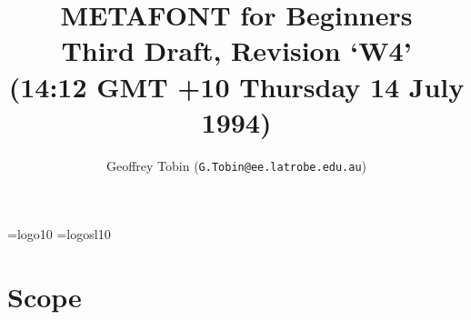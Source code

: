 

\oddsidemargin=0in
\evensidemargin=0in
\marginparwidth=0in
\marginparsep=0in


\textwidth=6.25in


\addtolength{\textheight}{\topmargin}
\topmargin=0in
\addtolength{\textheight}{0.4in}

\font\mf=logo10
\font\mfsl=logosl10
\hyphenchar{}
\hyphenchar{}
\newcommand{\MF}{{\mf META}\-{\mf FONT\/}}
\newcommand{\MFSL}{{\mfsl META}\-{\mfsl FONT\/}}
\newcommand{\MFbook}{{\sl The \MFSL{}book\/}}
\newcommand{\TeXbook}{{\sl The \TeX{}book\/}}
\newcommand{\BibTeX}{{\rm B\kern-.05em{\sc i\kern-.025em b}\kern-.08em
                      T\kern-.1667em\lower.7ex\hbox{E}\kern-.125emX}}
\newcommand{\ttbsl}{{\tt \char`\\\/}}  %

\title{%
  \vspace*{-1in}%
  METAFONT for Beginners\\%
  {\normalsize Third Draft, Revision `W4'}\\%
  {\normalsize (14:12 GMT +10  Thursday 14 July 1994)}%
}

\date{}

\author{Geoffrey {\sc Tobin} ({\tt G.Tobin@ee.latrobe.edu.au})}



\maketitle

\tableofcontents

\newpage


\section*{Scope}%

